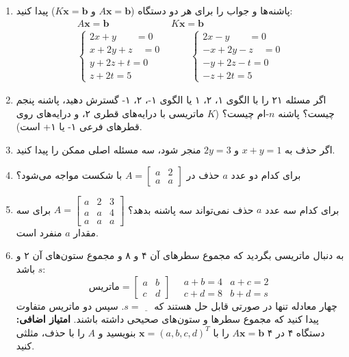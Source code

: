 \documentclass[12pt, a4paper]{book}
\theoremstyle{translator}
\begin{document}
\begin{enumerate}
		\item پاشنه‌ها و جواب را برای هر دو دستگاه ($A\mathbf{x}=\mathbf{b}$ و $K\mathbf{x}=\mathbf{b}$) پیدا کنید:
		\[
		\begin{array}{cc}
			A\mathbf{x}=\mathbf{b} & K\mathbf{x}=\mathbf{b} \\
			\begin{cases}
				2x + y \qquad = 0 \\
				x + 2y + z \quad = 0 \\
				y + 2z + t = 0 \\
				z + 2t = 5
			\end{cases}
			& \qquad
			\begin{cases}
				2x - y \qquad = 0 \\
				-x + 2y - z \quad = 0 \\
				-y + 2z - t = 0 \\
				-z + 2t = 5
			\end{cases}
		\end{array}
		\]
		
		\item اگر مسئله ۲۱ را با الگوی ۱، ۲، ۱ یا الگوی ۱-، ۲، ۱- گسترش دهید، پاشنه پنجم چیست؟ پاشنه $n$-ام چیست؟ ($K$ ماتریسی با درایه‌های قطری ۲، و درایه‌های روی قطرهای فرعی ۱- یا ۱+ است).
		
		\item اگر حذف به $x+y=1$ و $2y=3$ منجر شود، سه مسئله اصلی ممکن را پیدا کنید.
		
		\item برای کدام دو عدد $a$ حذف در $A = \begin{bmatrix} a & 2 \\ a & a \end{bmatrix}$ با شکست مواجه می‌شود؟
		
		\item برای کدام سه عدد $a$ حذف نمی‌تواند سه پاشنه بدهد؟ $A = \begin{bmatrix} a & 2 & 3 \\ a & a & 4 \\ a & a & a \end{bmatrix}$ برای سه مقدار $a$ منفرد است.
		
		\item به دنبال ماتریسی بگردید که مجموع سطرهای آن ۴ و ۸ و مجموع ستون‌های آن ۲ و $s$ باشد:
		\[
		\text{ماتریس} = \begin{bmatrix} a & b \\ c & d \end{bmatrix} \quad
		\begin{array}{ll}
			a+b=4 & a+c=2 \\
			c+d=8 & b+d=s
		\end{array}
		\]
		چهار معادله تنها در صورتی قابل حل هستند که $s = \underline{\phantom{00}}$. سپس دو ماتریس متفاوت پیدا کنید که مجموع سطرها و ستون‌های صحیحی داشته باشند. \textbf{امتیاز اضافی:} دستگاه ۴ در ۴ $A\mathbf{x}=\mathbf{b}$ را با $\mathbf{x}=(a,b,c,d)^T$ بنویسید و $A$ را با حذف، مثلثی کنید.
		

\end{enumerate}
\end{document}
